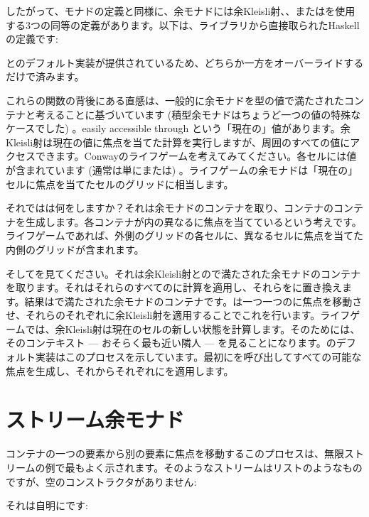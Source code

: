 したがって、モナドの定義と同様に、余モナドには余Kleisli射、、またはを使用する3つの同等の定義があります。以下は、ライブラリから直接取られたHaskellの定義です: 

とのデフォルト実装が提供されているため、どちらか一方をオーバーライドするだけで済みます。

これらの関数の背後にある直感は、一般的に余モナドを型の値で満たされたコンテナと考えることに基づいています (積型余モナドはちょうど一つの値の特殊なケースでした) 。easily accessible through という「現在の」値があります。余Kleisli射は現在の値に焦点を当てた計算を実行しますが、周囲のすべての値にアクセスできます。Conwayのライフゲームを考えてみてください。各セルには値が含まれています (通常は単にまたは) 。ライフゲームの余モナドは「現在の」セルに焦点を当てたセルのグリッドに相当します。

それではは何をしますか？それは余モナドのコンテナを取り、コンテナのコンテナを生成します。各コンテナが内の異なるに焦点を当てているという考えです。ライフゲームであれば、外側のグリッドの各セルに、異なるセルに焦点を当てた内側のグリッドが含まれます。

そしてを見てください。それは余Kleisli射とので満たされた余モナドのコンテナを取ります。それはそれらのすべてのに計算を適用し、それらをに置き換えます。結果はで満たされた余モナドのコンテナです。は一つ一つのに焦点を移動させ、それらのそれぞれに余Kleisli射を適用することでこれを行います。ライフゲームでは、余Kleisli射は現在のセルの新しい状態を計算します。そのためには、そのコンテキスト --- おそらく最も近い隣人 --- を見ることになります。のデフォルト実装はこのプロセスを示しています。最初にを呼び出してすべての可能な焦点を生成し、それからそれぞれにを適用します。

\section{ストリーム余モナド}

コンテナの一つの要素から別の要素に焦点を移動するこのプロセスは、無限ストリームの例で最もよく示されます。そのようなストリームはリストのようなものですが、空のコンストラクタがありません: 

それは自明にです: 

